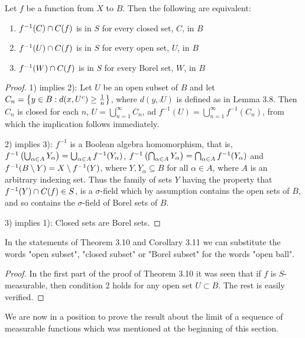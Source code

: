 \begin{lemma}
Let $f$ be a function from $X$ to $B$. Then the following are equivalent:
\begin{enumerate}[label=\arabic*)]
    \item $f^{-1}(C)\cap C(f)$ is in $S$ for every closed set, $C$, in $B$
    \item $f^{-1}(U)\cap C(f)$ is in $S$ for every open set, $U$, in $B$
    \item $f^{-1}(W)\cap C(f)$ is in $S$ for every Borel set, $W$, in $B$
\end{enumerate}
\end{lemma}
\begin{proof}
1) implies 2): Let $U$ be an open subset of $B$ and let $C_n=\left\{y\in B:d(x,{U}^c)\geq\frac1n\right\}$, where $d(y,\comp{U})$ is defined as in Lemma 3.8. Then $C_n$ is closed for each $n$, $U=\bigcup_{n=1}^\infty C_n$, ad $f^{-1}(U)=\bigcup_{n=1}^\infty f^{-1}(C_n)$, from which the implication follows immediately.

2) implies 3): $f^{-1}$ is a Boolean algebra homomorphism, that is, $f^{-1}\left(\bigcup_{\alpha\in A}Y_\alpha\right)=\bigcup_{\alpha\in A}f^{-1}(Y_\alpha)$, $f^{-1}\left(\bigcap_{\alpha\in A}Y_\alpha\right)=\bigcap_{\alpha\in A}f^{-1}(Y_\alpha)$ and $f^{-1}(B\setminus Y)=X\setminus f^{-1}(Y)$, where $Y,Y_\alpha\subseteq B$ for all $\alpha\in A$, where $A$ is an arbitrary indexing set. Thus the family of sets $Y$ having the property that $f^{-1}(Y)\cap C(f)\in S$, is a $\sigma$-field which by assumption contains the open sets of $B$, and so contains the $\sigma$-field of Borel sets of $B$.

3) implies 1): Closed sets are Borel sets.
\end{proof}

\begin{corollary}
In the statements of Theorem 3.10 and Corollary 3.11 we can substitute the words "open subset", "closed subset" or "Borel subset" for the words "open ball".
\end{corollary}

\begin{proof}
In the first part of the proof of Theorem 3.10 it was seen that if $f$ is $S$-measurable, then condition 2 holds for any open set $U \subset B$. The rest is easily verified.
\end{proof}

We are now in a position to prove the result about the limit of a sequence of measurable functions which was mentioned at the beginning of this section.


